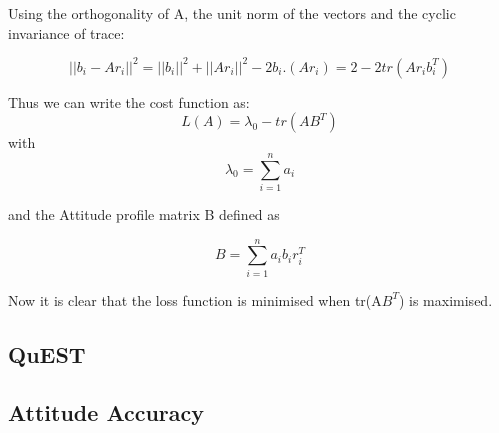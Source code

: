 {{{Using the orthogonality of A, the unit norm of the vectors and the cyclic invariance of trace:

\begin{equation}
||b_{i}-Ar_{i}||^2 = ||b_{i}||^2 + ||Ar_{i}||^2 -2b_{i}.(Ar_{i}) = 2- 2 tr(Ar_{i}b_{i}^{T})
\end{equation}

Thus we can write the cost function as:
\begin{equation}
    L(A)= \lambda _{0} - tr(AB^{T})
\end{equation}
with
\begin{equation}
    \lambda_{0}= \sum_{i=1}^{n} a_{i}
\end{equation}

and the Attitude profile matrix B defined as 

\begin{equation}
    B= \sum_{i=1}^{n} a_{i} b_{i} r_{i}^{T}
\end{equation}

Now it is clear that the loss function is minimised when tr(A$B^T$) is maximised.

}



}

\subsection{QuEST}
{
}


\subsection{Attitude Accuracy}
{
}


}
